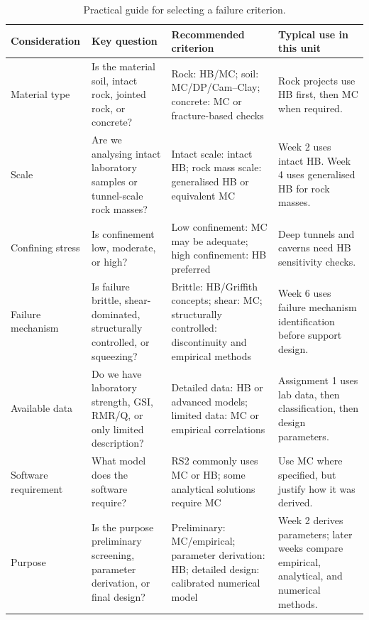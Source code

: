 \documentclass[a4paper,12pt]{article}
\begin{document}
\begin{table}[H]
\centering
\footnotesize
\begin{tabularx}{\textwidth}{l Y Y Y}
\toprule
\textbf{Consideration} & \textbf{Key question} & \textbf{Recommended criterion} & \textbf{Typical use in this unit} \\
\midrule
Material type
& Is the material soil, intact rock, jointed rock, or concrete?
& Rock: HB/MC; soil: MC/DP/Cam--Clay; concrete: MC or fracture-based checks
& Rock projects use HB first, then MC when required. \\

Scale
& Are we analysing intact laboratory samples or tunnel-scale rock masses?
& Intact scale: intact HB; rock mass scale: generalised HB or equivalent MC
& Week 2 uses intact HB. Week 4 uses generalised HB for rock masses. \\

Confining stress
& Is confinement low, moderate, or high?
& Low confinement: MC may be adequate; high confinement: HB preferred
& Deep tunnels and caverns need HB sensitivity checks. \\

Failure mechanism
& Is failure brittle, shear-dominated, structurally controlled, or squeezing?
& Brittle: HB/Griffith concepts; shear: MC; structurally controlled: discontinuity and empirical methods
& Week 6 uses failure mechanism identification before support design. \\

Available data
& Do we have laboratory strength, GSI, RMR/Q, or only limited description?
& Detailed data: HB or advanced models; limited data: MC or empirical correlations
& Assignment 1 uses lab data, then classification, then design parameters. \\

Software requirement
& What model does the software require?
& RS2 commonly uses MC or HB; some analytical solutions require MC
& Use MC where specified, but justify how it was derived. \\

Purpose
& Is the purpose preliminary screening, parameter derivation, or final design?
& Preliminary: MC/empirical; parameter derivation: HB; detailed design: calibrated numerical model
& Week 2 derives parameters; later weeks compare empirical, analytical, and numerical methods. \\
\bottomrule
\end{tabularx}
\caption{Practical guide for selecting a failure criterion.}
\label{tab:criterion_selection}
\end{table}
\end{document}
